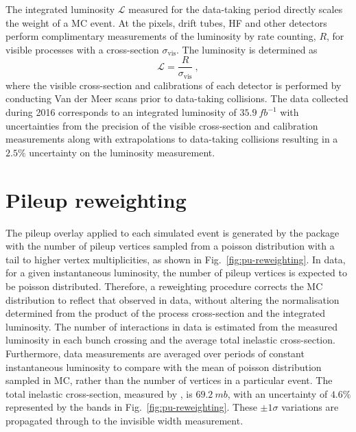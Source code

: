 The integrated luminosity $\mathcal{L}$ measured for the data-taking period directly scales the weight of a MC event. At \CMS the pixels, drift tubes, HF and other detectors perform complimentary measurements of the luminosity by rate counting, $R$, for visible processes with a cross-section $\sigma_{\mathrm{vis}}$. The luminosity is determined as
%
\begin{equation}
    \mathcal{L} = \frac{R}{\sigma_{\mathrm{vis}}}\ ,
\end{equation}
%
where the visible cross-section and calibrations of each detector is performed by conducting Van der Meer scans \cite{vanderMeer:296752} prior to data-taking collisions. The data collected during 2016 corresponds to an integrated luminosity of ${\SI{35.9}{fb^{-1}}}$ with uncertainties from the precision of the visible cross-section and calibration measurements along with extrapolations to data-taking collisions resulting in a $2.5\%$ uncertainty \cite{CMS:2017sdi} on the luminosity measurement. 

\section{Pileup reweighting}

The pileup overlay applied to each simulated event is generated by the \PYTHIA package with the number of pileup vertices sampled from a poisson distribution with a tail to higher vertex multiplicities, as shown in Fig.~\ref{fig:pu-reweighting}. In data, for a given instantaneous luminosity, the number of pileup vertices is expected to be poisson distributed. Therefore, a reweighting procedure corrects the MC distribution to reflect that observed in data, without altering the normalisation determined from the product of the process cross-section and the integrated luminosity. The number of interactions in data is estimated from the measured luminosity in each bunch crossing and the average total inelastic cross-section. Furthermore, data measurements are averaged over periods of constant instantaneous luminosity to compare with the mean of poisson distribution sampled in MC, rather than the number of vertices in a particular event. The total inelastic cross-section, measured by \CMS, is ${\SI{69.2}{mb}}$, with an uncertainty of $4.6\%$ represented by the bands in Fig.~\ref{fig:pu-reweighting}. These $\pm 1\sigma$ variations are propagated through to the \PZ invisible width measurement.

